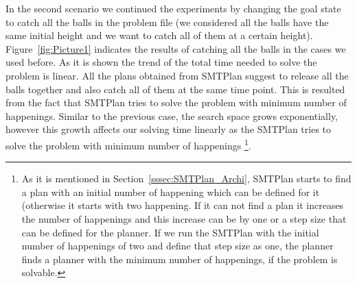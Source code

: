 
In the second scenario we continued the experiments by changing the goal state to catch all the balls in the problem file (we considered all the balls have the same initial height and we want to catch all of them at a certain height). Figure~\ref{fig:Picture1} indicates the results of catching all the balls in the cases we used before. As it is shown the trend of the total time needed to solve the problem is linear. All the plans obtained from SMTPlan suggest to release all the balls together and also catch all of them at the same time point. This is resulted from the fact that SMTPlan tries to solve the problem with minimum number of happenings. Similar to the previous case, the search space grows exponentially, however this growth affects our solving time linearly as the SMTPlan tries to solve the problem with minimum number of happenings \footnote{As it is mentioned in Section~\ref{sssec:SMTPlan_Archi}, SMTPlan starts to find a plan with an initial number of happening which can be defined for it (otherwise it starts with two happening. If it can not find a plan it increases the number of happenings and this increase can be by one or a step size that can be defined for the planner. If we run the SMTPlan with the initial number of happenings of two and define that step size as one, the planner finds a planner with the minimum number of happenings, if the problem is solvable.}.  

